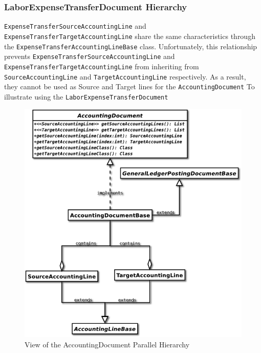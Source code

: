 \documentclass[12pt,notitlepage]{article}
\begin{document}
  \subsubsection{LaborExpenseTransferDocument Hierarchy}
  \verb|ExpenseTransferSourceAccountingLine| and \verb|ExpenseTransferTargetAccountingLine| share the same 
  characteristics through the \verb|ExpenseTransferAccountingLineBase| class. Unfortunately, this relationship
  prevents \verb|ExpenseTransferSourceAccountingLine| and \verb|ExpenseTransferTargetAccountingLine| from 
  inheriting from \verb|SourceAccountingLine| and \verb|TargetAccountingLine| respectively. As a result, they 
  cannot be used as Source and Target lines for the \verb|AccountingDocument|
  \newpage
  To illustrate using the \verb|LaborExpenseTransferDocument|
  \begin{figure}[!h]
    \caption{View of the AccountingDocument Parallel Hierarchy}
    \includegraphics[bb=10 300 300 640]{../Diagrams/AccountingDocumentParallelHierachy_class.png}
  \end{figure}
\end{document}
